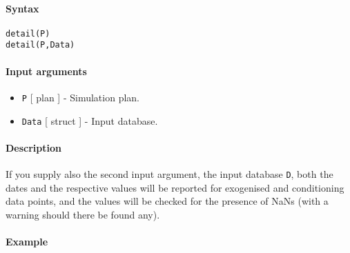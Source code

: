 


	\paragraph{Syntax}\label{syntax}

\begin{verbatim}
detail(P)
detail(P,Data)
\end{verbatim}

\paragraph{Input arguments}\label{input-arguments}

\begin{itemize}
\item
  \texttt{P} {[} plan {]} - Simulation plan.
\item
  \texttt{Data} {[} struct {]} - Input database.
\end{itemize}

\paragraph{Description}\label{description}

If you supply also the second input argument, the input database
\texttt{D}, both the dates and the respective values will be reported
for exogenised and conditioning data points, and the values will be
checked for the presence of NaNs (with a warning should there be found
any).

\paragraph{Example}\label{example}


